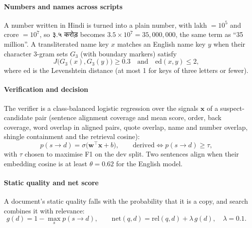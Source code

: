\documentclass[11pt,a4paper]{article}
\newcommand{\hi}[1]{{\devfont #1}}
\begin{document}
\paragraph{Numbers and names across scripts} A number written in Hindi is turned into a plain number, with lakh $=10^5$ and crore $=10^7$, so \hi{३.५ करोड़} becomes $3.5\times10^{7}=35{,}000{,}000$, the same term as ``35 million''. A transliterated name key $x$ matches an English name key $y$ when their character 3-gram sets $G_3$ (with boundary markers) satisfy
\begin{equation}
J\bigl(G_3(x),G_3(y)\bigr)\ge 0.3\quad\text{and}\quad \mathrm{ed}(x,y)\le 2, \label{eq:kgram}
\end{equation}
where $\mathrm{ed}$ is the Levenshtein distance (at most 1 for keys of three letters or fewer).

\paragraph{Verification and decision} The verifier is a class-balanced logistic regression over the signals $\mathbf{x}$ of a suspect-candidate pair (sentence alignment coverage and mean score, order, back coverage, word overlap in aligned pairs, quote overlap, name and number overlap, shingle containment and the retrieval cosine):
\begin{equation}
p(s\to d)=\sigma\bigl(\mathbf{w}^{\top}\mathbf{x}+b\bigr),\qquad \text{derived}\iff p(s\to d)\ge\tau, \label{eq:logit}
\end{equation}
with $\tau$ chosen to maximise F1 on the dev split. Two sentences align when their embedding cosine is at least $\theta=0.62$ for the English model.

\paragraph{Static quality and net score} A document's static quality falls with the probability that it is a copy, and search combines it with relevance:
\begin{equation}
g(d)=1-\max_{s} p(s\to d),\qquad \mathrm{net}(q,d)=\mathrm{rel}(q,d)+\lambda\,g(d),\quad \lambda=0.1. \label{eq:net}
\end{equation}
\end{document}
